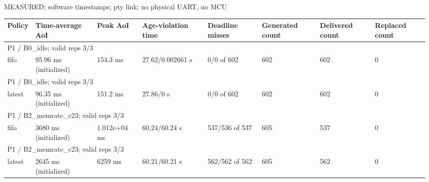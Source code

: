 \par\noindent MEASURED; software timestamps; pty link; no physical UART, no MCU\par
\begin{tabular}{llllllll}
\toprule
Policy & Time-average AoI & Peak AoI & Age-violation time & Deadline misses & Generated count & Delivered count & Replaced count \\
\midrule
\multicolumn{8}{l}{P1 / B0\_idle; valid reps 3/3} \\
fifo & 95.96 ms (initialized) & 154.3 ms & 27.62/0.002661 s & 0/0 of 602 & 602 & 602 & 0 \\
\multicolumn{8}{l}{P1 / B0\_idle; valid reps 3/3} \\
latest & 96.35 ms (initialized) & 151.2 ms & 27.86/0 s & 0/0 of 602 & 602 & 602 & 0 \\
\multicolumn{8}{l}{P1 / B2\_memrate\_c23; valid reps 3/3} \\
fifo & 3680 ms (initialized) & 1.012e+04 ms & 60.24/60.24 s & 537/536 of 537 & 605 & 537 & 0 \\
\multicolumn{8}{l}{P1 / B2\_memrate\_c23; valid reps 3/3} \\
latest & 2645 ms (initialized) & 6259 ms & 60.21/60.21 s & 562/562 of 562 & 605 & 562 & 0 \\
\bottomrule
\end{tabular}
